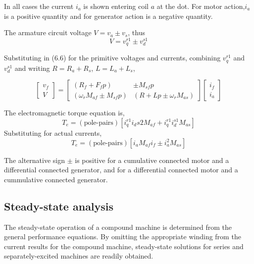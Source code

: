 \documentclass[a4paper,numbers=noenddot,12pt]{scrbook}
\begin{document}
In all cases the current $i_a$ is shown entering coil $a$ at the dot. For motor action,$i_a$ is a positive quantity and for generator action is a negative quantity.

The armature circuit voltage $V=v_a\pm v_s$, thus
\begin{equation*}
    V=v_q^{r1} \pm v_d^{s1}
    \label{}
\end{equation*}

Substituting in (6.6) for the primitive voltages and currents, combining $v_q^{r1}$ and $v_d^{s1}$ and writing $R = R_a + R_s$, $L = L_a + L_s$,

\begin{equation}
    \begin{bmatrix}
        v_f \\[2ex] V
    \end{bmatrix} =
    \begin{bmatrix}
        (R_f +F_f p) & \pm M_{sf} p \\[2ex]
        (\omega_r M_{af} \pm M_{sf} p) & (R + L p \pm \omega_r M_{as})
    \end{bmatrix}
    \begin{bmatrix}
        i_f \\[2ex] i_a
    \end{bmatrix}
    \label{}
\end{equation}

The electromagnetic torque equation is,
\begin{equation*}
    T_e = (\text{pole-pairs})[i_q^{r1} i_d{s2} M_{af} + i_q^{r1} i_d^{s1} M_{as}]
\end{equation*}
Substituting for actual currents,
\begin{equation}
    T_e = (\text{pole-pairs})[i_a M_{af} i_f \pm i_a^{2} M_{as}]
    \label{}
\end{equation}

The alternative sign $\pm$ is positive for a cumulative connected motor and a differential connected generator, and for a differential connected motor and a cummulative connected generator.

\subsection{Steady-state analysis} The steady-state operation of a compound machine is determined from the general performance equations. By omitting the appropriate winding from the current results for the compound machine, steady-state solutions for series and separately-excited machines are readily obtained.
\end{document}
